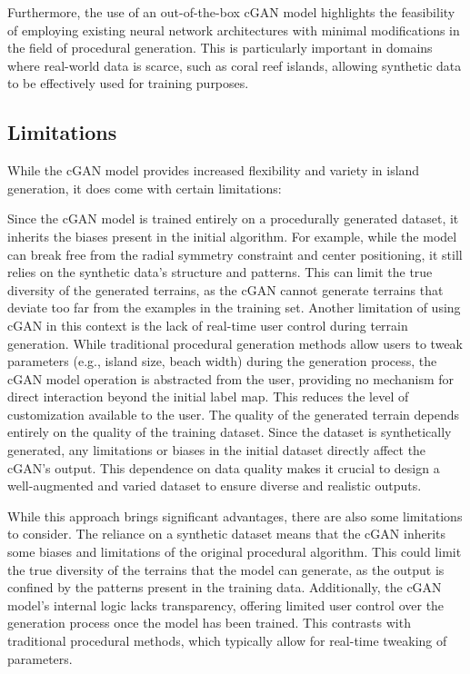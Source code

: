 Furthermore, the use of an out-of-the-box cGAN model highlights the feasibility of employing existing neural network architectures with minimal modifications in the field of procedural generation. This is particularly important in domains where real-world data is scarce, such as coral reef islands, allowing synthetic data to be effectively used for training purposes.


\subsection{Limitations}
\label{sec:coral-island_limitations}

While the cGAN model provides increased flexibility and variety in island generation, it does come with certain limitations:

\begin{Itemize}
     Since the cGAN model is trained entirely on a procedurally generated dataset, it inherits the biases present in the initial algorithm. For example, while the model can break free from the radial symmetry constraint and center positioning, it still relies on the synthetic data's structure and patterns. This can limit the true diversity of the generated terrains, as the cGAN cannot generate terrains that deviate too far from the examples in the training set.
     Another limitation of using cGAN in this context is the lack of real-time user control during terrain generation. While traditional procedural generation methods allow users to tweak parameters (e.g., island size, beach width) during the generation process, the cGAN model operation is abstracted from the user, providing no mechanism for direct interaction beyond the initial label map. This reduces the level of customization available to the user. 
     The quality of the generated terrain depends entirely on the quality of the training dataset. Since the dataset is synthetically generated, any limitations or biases in the initial dataset directly affect the cGAN's output. This dependence on data quality makes it crucial to design a well-augmented and varied dataset to ensure diverse and realistic outputs.
\end{Itemize}

While this approach brings significant advantages, there are also some limitations to consider. The reliance on a synthetic dataset means that the cGAN inherits some biases and limitations of the original procedural algorithm. This could limit the true diversity of the terrains that the model can generate, as the output is confined by the patterns present in the training data. Additionally, the cGAN model's internal logic lacks transparency, offering limited user control over the generation process once the model has been trained. This contrasts with traditional procedural methods, which typically allow for real-time tweaking of parameters.


